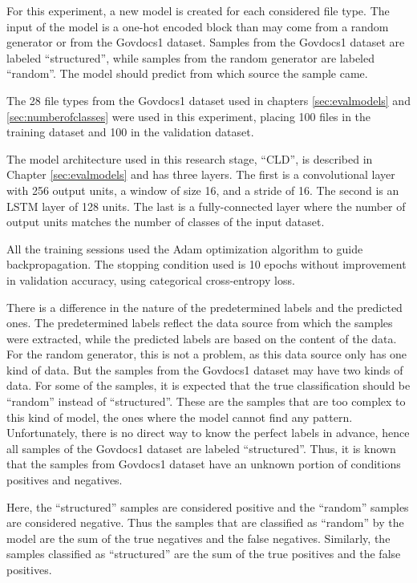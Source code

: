 
For this experiment, a new model is created for each considered file type. The input of the model is a one-hot encoded block than may come from a random generator or from the Govdocs1 dataset. Samples from the Govdocs1 dataset are labeled ``structured'', while samples from the random generator are labeled ``random''. The model should predict from which source the sample came.

The 28 file types from the Govdocs1 dataset \cite{garfinkel_bringing_2009} used in chapters \ref{sec:evalmodels} and \ref{sec:numberofclasses} were used in this experiment, placing 100 files in the training dataset and 100 in the validation dataset.


The model architecture used in this research stage, ``CLD'', is described in Chapter \ref{sec:evalmodels} and has three layers. The first is a convolutional layer with 256 output units, a window of size 16, and a stride of 16. The second is an LSTM layer of 128 units. The last is a fully-connected layer where the number of output units matches the number of classes of the input dataset.

All the training sessions used the Adam \cite{kingma_adam:_2014}
optimization algorithm to guide backpropagation.
The stopping condition used is 10 epochs without improvement in validation accuracy, using categorical cross-entropy loss.


There is a difference in the nature of the predetermined labels and the predicted ones. The predetermined labels reflect the data source from which the samples were extracted, while the predicted labels are based on the content of the data. For the random generator, this is not a problem, as this data source only has one kind of data. But the samples from the Govdocs1 dataset may have two kinds of data. For some of the samples, it is expected that the true classification should be ``random'' instead of ``structured''. These are the samples that are too complex to this kind of model, the ones where the model cannot find any pattern. Unfortunately, there is no direct way to know the perfect labels in advance, hence all samples of the Govdocs1 dataset are labeled ``structured''. Thus, it is known that the samples from Govdocs1 dataset have an unknown portion of conditions positives and negatives.

Here, the ``structured'' samples are considered positive and the ``random'' samples are considered negative. Thus the samples that are classified as ``random'' by the model are the sum of the true negatives and the false negatives. Similarly, the samples classified as ``structured'' are the sum of the true positives and the false positives.

